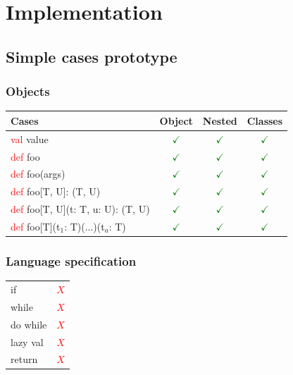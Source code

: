 \documentclass{beamer}
\begin{document}
\section{Implementation}
\subsection{Simple cases prototype}

\newcommand{\TCR}{\textcolor{red}}
\newcommand{\TCG}{\textcolor{green}}
\newcommand{\TCB}{\textcolor{blue}}
\newcommand{\TCM}{\textcolor{brown}}
\newcommand{\TCAG}{\textcolor{applegreen}}


\begin{frame}
\frametitle{Objects}
\begin{table}
\begin{tabular}{lccc}
\toprule
Cases & Object & Nested & Classes\\
\midrule
\TCR{val} \TCAG{value} & \TCG{$\checkmark$} & \TCG{$\checkmark$} & \TCG{$\checkmark$} \\
\TCR{def} \TCAG{foo} & \TCG{$\checkmark$} & \TCG{$\checkmark$} & \TCG{$\checkmark$} \\
\TCR{def} \TCAG{foo}(args) & \TCG{$\checkmark$} & \TCG{$\checkmark$} & \TCG{$\checkmark$} \\
\TCR{def} \TCAG{foo}[T, U]: (T, U) & \TCG{$\checkmark$} & \TCG{$\checkmark$} & \TCG{$\checkmark$} \\
\TCR{def} \TCAG{foo}[T, U](t: T, u: U): (T, U) & \TCG{$\checkmark$} & \TCG{$\checkmark$} & \TCG{$\checkmark$} \\
\TCR{def} \TCAG{foo}[T](t$_1$: T)(...)(t$_a$: T) & \TCG{$\checkmark$} & \TCG{$\checkmark$} & \TCG{$\checkmark$} \\
\bottomrule
\end{tabular}
\end{table}
\end{frame}


\begin{frame}
\frametitle{Language specification}

\begin{table}
\begin{tabular}{lc}
\toprule
\midrule
if & \TCR{$X$} \\
while & \TCR{$X$} \\
do while & \TCR{$X$} \\
lazy val & \TCR{$X$} \\
return & \TCR{$X$} \\
\bottomrule
\end{tabular}
\end{table}
\end{frame}
\end{document}
